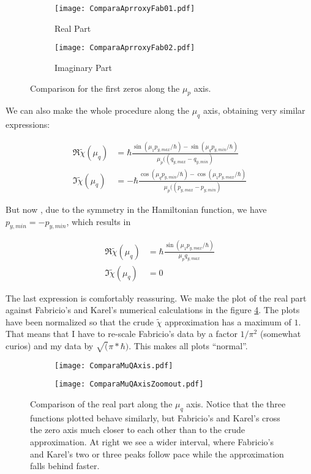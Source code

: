 \documentclass[a4paper,12pt]{article}
\begin{document}
\begin{figure}[h]
  \centering
  \begin{subfigure}[b]{0.45\textwidth}
    \centering  
    \texttt{[image: ComparaAprroxyFab01.pdf]}
      \caption{Real Part}
      \label{comparafabreal}
  \end{subfigure}%
  \begin{subfigure}[b]{0.45\textwidth}
    \centering  
    \texttt{[image: ComparaAprroxyFab02.pdf]}
      \caption{Imaginary Part}
      \label{comparafabimag}
  \end{subfigure}%
  \caption{Comparison for the first zeros along the $\mu_p$ axis. 
}\label{comparafab}
\end{figure}     


We can also make the whole procedure along the $\mu_q$ axis, obtaining
very similar expressions:

\begin{align}
\Re \tilde{\chi} (\mu_q)  &= \hbar
\frac{\sin(\mu_1 p_{y,max} /\hbar)-\sin(\mu_q p_{y,min} /\hbar)}
{\mu_p ( (q_{y,max}- q_{y,min})} \\
\Im \tilde{\chi} (\mu_q)  &= -\hbar
\frac{\cos(\mu_q p_{y,min} /\hbar)-\cos(\mu_1 p_{y,max} /\hbar)}
{\mu_p ( (p_{y,max}- p_{y,min})} 
\end{align}

But now , due to the symmetry in the Hamiltonian function, we have
$p_{y,min}=-p_{y,min}$, which results in


\begin{align}\label{CrudeApprox2MuQ}
\Re \tilde{\chi} (\mu_q)  &= \hbar
\frac{\sin(\mu_1 p_{y,max} /\hbar)}
{\mu_p q_{y,max}} \\
\Im \tilde{\chi} (\mu_q)  &= 0
\end{align}

The last expression is comfortably reassuring. We make the plot of the real
part against Fabricio's and Karel's numerical calculations in the figure
\ref{comparatodas02}. The plots have been normalized so that the 
crude $\tilde{\chi}$ approximation has a maximum of $1$. That means
that I have to re-scale Fabricio's data by a factor $1/\pi^2$
(somewhat curios) and my data by $\sqrt(\pi*\hbar)$. This makes all
plots ``normal''.

\begin{figure}[h]
  \centering     
  \begin{subfigure}[b]{0.45\textwidth}
    \centering
    \texttt{[image: ComparaMuQAxis.pdf]}
   \end{subfigure}%
  \begin{subfigure}[b]{0.45\textwidth}
    \centering
    \texttt{[image: ComparaMuQAxisZoomout.pdf]}
    \end{subfigure}%
  \caption{Comparison of the real part along the $\mu_q$ axis. Notice that
the three functions plotted behave similarly, but Fabricio's and Karel's cross
the zero axis much closer to each other than to the crude approximation. At right we
see a wider interval, where Fabricio's and Karel's two or three peaks follow pace
while the approximation falls behind faster. }
  \label{comparatodas02}
\end{figure}
\end{document}

